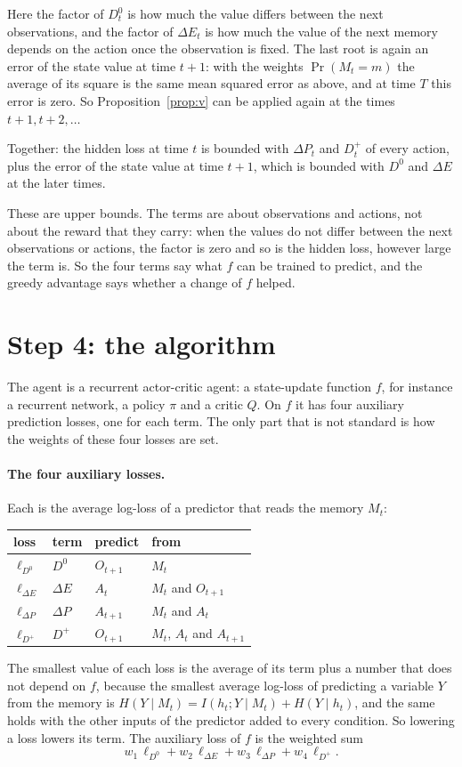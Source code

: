 \documentclass[11pt]{article}
\theoremstyle{definition}
\newcommand{\dE}{\Delta E}
\newcommand{\dP}{\Delta P}
\begin{document}
Here the factor of $D^0_t$ is how much the value differs between the next observations, and the factor of $\dE_t$ is how much the value of the next memory depends on the action once the observation is fixed. The last root is again an error of the state value at time $t+1$: with the weights $\Pr(M_t=m)$ the average of its square is the same mean squared error as above, and at time $T$ this error is zero. So Proposition~\ref{prop:v} can be applied again at the times $t+1,t+2,\dots$

Together: the hidden loss at time $t$ is bounded with $\dP_t$ and $D^+_t$ of every action, plus the error of the state value at time $t+1$, which is bounded with $D^0$ and $\dE$ at the later times.

These are upper bounds. The terms are about observations and actions, not about the reward that they carry: when the values do not differ between the next observations or actions, the factor is zero and so is the hidden loss, however large the term is. So the four terms say what $f$ can be trained to predict, and the greedy advantage says whether a change of $f$ helped.

\section{Step 4: the algorithm}\label{sec:algo}

The agent is a recurrent actor-critic agent: a state-update function $f$, for instance a recurrent network, a policy $\pi$ and a critic $Q$. On $f$ it has four auxiliary prediction losses, one for each term. The only part that is not standard is how the weights of these four losses are set.

\paragraph{The four auxiliary losses.} Each is the average log-loss of a predictor that reads the memory $M_t$:
\begin{center}
\small
\begin{tabular}{llll}
\hline
loss & term & predict & from\\
\hline
$\ell_{D^0}$ & $D^0$ & $O_{t+1}$ & $M_t$\\
$\ell_{\dE}$ & $\dE$ & $A_t$ & $M_t$ and $O_{t+1}$\\
$\ell_{\dP}$ & $\dP$ & $A_{t+1}$ & $M_t$ and $A_t$\\
$\ell_{D^+}$ & $D^+$ & $O_{t+1}$ & $M_t$, $A_t$ and $A_{t+1}$\\
\hline
\end{tabular}
\end{center}
The smallest value of each loss is the average of its term plus a number that does not depend on $f$, because the smallest average log-loss of predicting a variable $Y$ from the memory is $H(Y\mid M_t)=I(h_t;Y\mid M_t)+H(Y\mid h_t)$, and the same holds with the other inputs of the predictor added to every condition. So lowering a loss lowers its term. The auxiliary loss of $f$ is the weighted sum
\[
w_1\,\ell_{D^0}+w_2\,\ell_{\dE}+w_3\,\ell_{\dP}+w_4\,\ell_{D^+} .
\]
\end{document}
